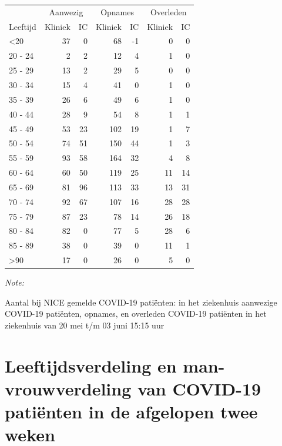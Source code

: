 \documentclass[
  english,
  man,floatsintext]{apa6}
\begin{document}
\begin{table}
\centering\begingroup\fontsize{10}{12}\selectfont

\begin{threeparttable}
\begin{tabular}{lrrrrrr}
\toprule
\multicolumn{1}{c}{ } & \multicolumn{2}{c}{Aanwezig} & \multicolumn{2}{c}{Opnames} & \multicolumn{2}{c}{Overleden} \\
\cmidrule(l{3pt}r{3pt}){2-3} \cmidrule(l{3pt}r{3pt}){4-5} \cmidrule(l{3pt}r{3pt}){6-7}
Leeftijd & Kliniek & IC & Kliniek & IC & Kliniek & IC\\
\midrule
<20 & 37 & 0 & 68 & -1 & 0 & 0\\
20 - 24 & 2 & 2 & 12 & 4 & 1 & 0\\
25 - 29 & 13 & 2 & 29 & 5 & 0 & 0\\
30 - 34 & 15 & 4 & 41 & 0 & 1 & 0\\
35 - 39 & 26 & 6 & 49 & 6 & 1 & 0\\
40 - 44 & 28 & 9 & 54 & 8 & 1 & 1\\
45 - 49 & 53 & 23 & 102 & 19 & 1 & 7\\
50 - 54 & 74 & 51 & 150 & 44 & 1 & 3\\
55 - 59 & 93 & 58 & 164 & 32 & 4 & 8\\
60 - 64 & 60 & 50 & 119 & 25 & 11 & 14\\
65 - 69 & 81 & 96 & 113 & 33 & 13 & 31\\
70 - 74 & 92 & 67 & 107 & 16 & 28 & 28\\
75 - 79 & 87 & 23 & 78 & 14 & 26 & 18\\
80 - 84 & 82 & 0 & 77 & 5 & 28 & 6\\
85 - 89 & 38 & 0 & 39 & 0 & 11 & 1\\
>90 & 17 & 0 & 26 & 0 & 5 & 0\\
\bottomrule
\end{tabular}
\begin{tablenotes}
\item \textit{Note: } 
\item Aantal bij NICE gemelde COVID-19 patiënten: in het ziekenhuis aanwezige COVID-19 patiënten, opnames, en overleden COVID-19 patiënten in het ziekenhuis van 20 mei t/m 03 juni 15:15 uur
\end{tablenotes}
\end{threeparttable}
\endgroup{}
\end{table}

\newpage

\hypertarget{leeftijdsverdeling-en-man-vrouwverdeling-van-covid-19-patiuxebnten-in-de-afgelopen-twee-weken}{%
\section{Leeftijdsverdeling en man-vrouwverdeling van COVID-19 patiënten in de afgelopen twee weken}\label{leeftijdsverdeling-en-man-vrouwverdeling-van-covid-19-patiuxebnten-in-de-afgelopen-twee-weken}}
\end{document}
